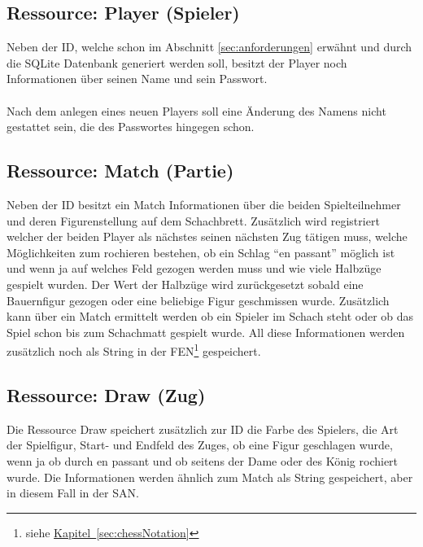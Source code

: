 \subsection{Ressource: Player (Spieler)}\label{sec:resplayer}
Neben der ID, welche schon im Abschnitt \ref{sec:anforderungen} erwähnt und durch die SQLite Datenbank generiert werden soll, besitzt der Player noch Informationen über seinen Name und sein Passwort.\\
\\
Nach dem anlegen eines neuen Players soll eine Änderung des Namens nicht gestattet sein, die des Passwortes hingegen schon.

\subsection{Ressource: Match (Partie)}\label{sec:resmatch}
Neben der ID besitzt ein Match Informationen über die beiden Spielteilnehmer und deren Figurenstellung auf dem Schachbrett. Zusätzlich wird registriert welcher der beiden Player als nächstes seinen nächsten Zug tätigen muss, welche Möglichkeiten zum rochieren bestehen, ob ein Schlag \enquote{en passant} möglich ist und wenn ja auf welches Feld gezogen werden muss und wie viele Halbzüge gespielt wurden. Der Wert der Halbzüge wird zurückgesetzt sobald eine Bauernfigur gezogen oder eine beliebige Figur geschmissen wurde. Zusätzlich kann über ein Match ermittelt werden ob ein Spieler im Schach steht oder ob das Spiel schon bis zum Schachmatt gespielt wurde. All diese Informationen werden zusätzlich noch als String in der \gls{FEN}\footnote{\label{foot:chapter}siehe \hyperref[sec:chessNotation]{Kapitel~\ref{sec:chessNotation}}} gespeichert.

\subsection{Ressource: Draw (Zug)}\label{sec:resdraw}
Die Ressource Draw speichert zusätzlich zur ID die Farbe des Spielers, die Art der Spielfigur, Start- und Endfeld des Zuges, ob eine Figur geschlagen wurde, wenn ja ob durch en passant und ob seitens der Dame oder des König rochiert wurde. Die Informationen werden ähnlich zum Match als String gespeichert, aber in diesem Fall in der \gls{SAN}.

